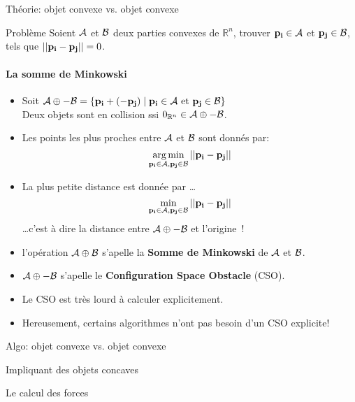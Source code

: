 \begin{frame}{Théorie: objet convexe vs. objet convexe}
    \begin{block}{Problème}
        Soient $\mathcal{A}$ et $\mathcal{B}$ deux parties convexes de
        $\mathbb{R}^n$, trouver ${\bf p_i} \in \mathcal{A}$ et ${\bf p_j} \in
        \mathcal{B}$, tels que $|| {\bf p_i} - {\bf p_j} || = 0$.
    \end{block}
     {
        \framesubtitle{La somme de Minkowski}
    \begin{overlayarea}{10cm}{10cm}
     {
    \begin{itemize}
        \item<2-4> Soit $\mathcal{A} \oplus -\mathcal{B} = \{ {\bf p_i} + (-{\bf p_j}) \mid {\bf p_i} \in
            \mathcal{A} \text{ et } {\bf p_j} \in \mathcal{B} \}$\\
            Deux objets sont en collision ssi $0_{\mathbb{R}^n} \in
            \mathcal{A} \oplus -\mathcal{B}$.
        \item<3-4> Les points les plus proches entre $\mathcal{A}$ et
            $\mathcal{B}$ sont donnés par: \[ \operatorname*{arg\,min}\limits_{{\bf p_i} \in
            \mathcal{A}, {\bf p_j} \in \mathcal{B}} || {\bf p_i} - {\bf p_j} || \]
        \item<4> La plus petite distance est donnée par \ldots
            \[ \min\limits_{{\bf p_i} \in \mathcal{A},
            {\bf p_j} \in \mathcal{B}} || {\bf p_i} - {\bf p_j} || \]
            \ldots c’est à dire la distance entre $\mathcal{A} \oplus
            -\mathcal{B}$ et l’origine~!
    \end{itemize}
    }
     {
    \begin{itemize}
        \item l’opération $\mathcal{A} \oplus \mathcal{B}$ s’apelle la
            \textbf{Somme de Minkowski} de $\mathcal{A}$ et $\mathcal{B}$.
        \item $\mathcal{A} \oplus - \mathcal{B}$ s’apelle le
            \textbf{Configuration Space Obstacle} (CSO).
        \item Le CSO est très lourd à calculer explicitement.
        \item Hereusement, certains algorithmes n’ont pas besoin d’un CSO explicite!
    \end{itemize}
    }
    \end{overlayarea}
    }
\end{frame}

\begin{frame}{Algo: objet convexe vs. objet convexe}
\end{frame}

\begin{frame}{Impliquant des objets concaves}
\end{frame}

\begin{frame}{Le calcul des forces}
\end{frame}

